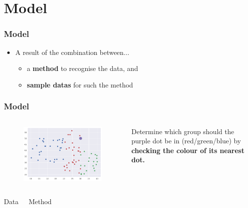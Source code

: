 \documentclass[]{beamer}
\begin{document}
\section{Model}

\begin{frame}
	\frametitle{Model}
	\begin{itemize}
		\item<2-> A result of the combination between...
		      \begin{itemize}
			      \item<3-> a \textbf{method} to recognise the data, and
			      \item<4-> \textbf{sample datas} for such the method
		      \end{itemize}
	\end{itemize}
\end{frame}


\begin{frame}
	\frametitle{Model}
	\begin{columns}
		\begin{figure}
			\includegraphics[scale=.3]{imgs/simple_knn.png}
		\end{figure}
		Determine which group should the purple dot be in (red/green/blue) by \textbf{checking the colour of its nearest dot.}
	\end{columns}
	\begin{columns}
		\column{0.5\textwidth}
		\begin{center}
			\Large Data
		\end{center}
		\column{0.5\textwidth}
		\begin{center}
			\Large Method
		\end{center}
	\end{columns}
\end{frame}
\end{document}
